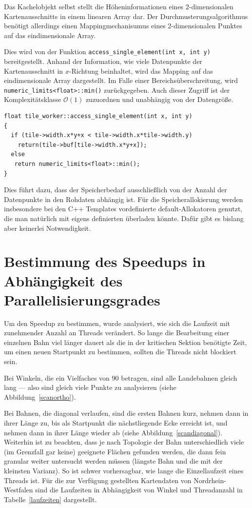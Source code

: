 \documentclass[10pt,a4paper]{report}
\begin{document}
Das Kachelobjekt selbst stellt die Höheninformationen eines 2-dimensionalen Kartenausschnitts in einem linearen Array dar. Der Durchmusterungsalgorithmus benötigt allerdings einen Mappingmechanisumus eines 2-dimensionalen Punktes auf das eindimensionale Array.

Dies wird von der Funktion \texttt{access\_single\_element(int\ x, int\ y)} bereitgestellt. Anhand der Information, wie viele Datenpunkte der Kartenausschnitt in $x$-Richtung beinhaltet, wird das Mapping auf das eindimensionale Array dargestellt. Im Falle einer Bereichsüberschreitung, wird \texttt{numeric\_limits<float>::min()} zurückgegeben.
Auch dieser Zugriff ist der Komplexitätsklasse $\mathcal O(1)$ zuzuordnen und unabhängig von der Datengröße.

\begin{lstlisting}[language=myC]
float tile_worker::access_single_element(int x, int y)
{
  if (tile->width.x*y+x < tile->width.x*tile->width.y)
    return(tile->buf[tile->width.x*y+x]);
  else
   return numeric_limits<float>::min();
}
\end{lstlisting}

Dies führt dazu, dass der Speicherbedarf ausschließlich von der Anzahl der Datenpunkte in den Rohdaten abhängig ist. Für die Speicherallokierung werden insbesondere bei den C++ Templates vordefinierte default-Allokatoren genutzt, die man natürlich mit eigens definierten überladen könnte. Dafür gibt es bislang aber keinerlei Notwendigkeit.
 


\section{Bestimmung des Speedups in Abhängigkeit des Parallelisierungsgrades}

Um den Speedup zu bestimmen, wurde analysiert, wie sich die Laufzeit mit zunehmender Anzahl an Threads verändert. So lange die Bearbeitung einer einzelnen Bahn viel länger dauert als die in der kritischen Sektion benötigte Zeit, um einen neuen Startpunkt zu bestimmen, sollten die Threads nicht blockiert sein.

Bei Winkeln, die ein Vielfaches von $90$ betragen, sind alle Landebahnen gleich lang --- also sind gleich viele Punkte zu analysieren (siehe Abbildung~\ref{scanortho}).

Bei Bahnen, die diagonal verlaufen, sind die ersten Bahnen kurz, nehmen dann in ihrer Länge zu, bis als Startpunkt die nächstliegende Ecke erreicht ist, und nehmen dann in ihrer Länge wieder ab (siehe Abbildung~\ref{scandiagonal}). 
Weiterhin ist zu beachten, dass je nach Topologie der Bahn unterschiedlich viele (im Grenzfall gar keine) geeignete Flächen gefunden werden, die dann fein granular weiter untersucht werden müssen (längste Bahn und die mit der kleinsten Varianz). So ist schwer vorhersagbar, wie lange die Einzellaufzeit eines Threads ist.
Für die zur Verfügung gestellten Kartendaten von Nordrhein-Westfalen sind die Laufzeiten in Abhängigkeit von Winkel und Threadanzahl in Tabelle~\ref{laufzeiten} dargestellt.
\end{document}
